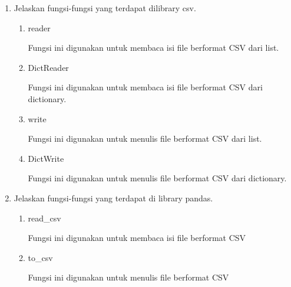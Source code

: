 \begin{enumerate}
	\item Jelaskan fungsi-fungsi yang terdapat dilibrary csv.
      	\begin{enumerate}
		\item reader
		
		   Fungsi ini digunakan untuk membaca isi file berformat CSV dari list.
		
		   
		
		\item DictReader
		
		   Fungsi ini digunakan untuk membaca isi file berformat CSV dari dictionary.
		
		   
		
		\item write
		
		   Fungsi ini digunakan untuk menulis file berformat CSV dari list.
		
		   
		
		\item DictWrite
		
		   Fungsi ini digunakan untuk menulis file berformat CSV dari dictionary.
		
		   
	\end{enumerate}
	\item Jelaskan fungsi-fungsi yang terdapat di library pandas.
      	\begin{enumerate}
		\item read\_csv
		
		   Fungsi ini digunakan untuk membaca isi file berformat CSV
		
		   
		
		\item to\_csv
		
		   Fungsi ini digunakan untuk menulis file berformat CSV
		
		   
		

\end{enumerate}
\end{enumerate}
